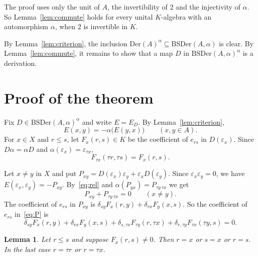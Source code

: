 \documentclass[]{interact}
\theoremstyle{plain}
\newtheorem{lemma}[theorem]{Lemma}
\theoremstyle{definition}
\theoremstyle{remark}
\newcommand{\Der}{\mathrm{Der}}
\newcommand{\BSDer}{\mathrm{BSDer}}
\begin{document}
The proof uses only the unit of $A$, the invertibility of $2$ and the injectivity of $\alpha$. %
So Lemma~\ref{lem:commute} holds for every unital $K$-algebra with an automorphism $\alpha$, when $2$ is invertible in $K$. %

By Lemma~\ref{lem:criterion}, the inclusion $\Der(A)^\alpha \subseteq \BSDer(A,\alpha)$ is clear.
By Lemma~\ref{lem:commute}, it remains to show that a map $D$ in $\BSDer(A,\alpha)^\alpha$ is a derivation. %

\section{Proof of the theorem}\label{sec:proof}

Fix $D \in \BSDer(A,\alpha)^\alpha$ and write $E = E_D$.
By Lemma~\ref{lem:criterion},
\begin{equation}\label{eq:rel}
E(x,y) = -\alpha\bigl(E(y,x)\bigr) \qquad (x, y \in A).
\end{equation}
For $x \in X$ and $r \le s$, let $F_x(r,s) \in K$ be the coefficient of $e_{rs}$ in $D(\varepsilon_x)$.
Since $D\alpha = \alpha D$ and $\alpha(\varepsilon_x) = \varepsilon_{\tau x}$,
\begin{equation}\label{eq:equi}
F_{\tau x}(\tau r, \tau s) = F_x(r,s).
\end{equation}

Let $x \ne y$ in $X$ and put $P_{xy} = D(\varepsilon_x)\varepsilon_y + \varepsilon_x D(\varepsilon_y)$.
Since $\varepsilon_x\varepsilon_y = 0$, we have $E(\varepsilon_x,\varepsilon_y) = -P_{xy}$.
By~\eqref{eq:rel} and $\alpha(P_{yx}) = P_{\tau y\,\tau x}$ we get
\begin{equation}\label{eq:P}
P_{xy} + P_{\tau y\,\tau x} = 0 \qquad (x \ne y).
\end{equation}
The coefficient of $e_{rs}$ in $P_{xy}$ is $\delta_{sy}F_x(r,y) + \delta_{rx}F_y(x,s)$. %
So the coefficient of $e_{rs}$ in~\eqref{eq:P} is
\begin{equation}\label{eq:coeff}
\delta_{sy}F_x(r,y) + \delta_{rx}F_y(x,s) + \delta_{s,\tau x}F_{\tau y}(r,\tau x) + \delta_{r,\tau y}F_{\tau x}(\tau y, s) = 0.
\end{equation}

\begin{lemma}\label{lem:support}
Let $r \le s$ and suppose $F_x(r,s) \ne 0$.
Then $r = x$ or $s = x$ or $r = s$.
In the last case $r = \tau r$ or $r = \tau x$.
\end{lemma}
\end{document}
